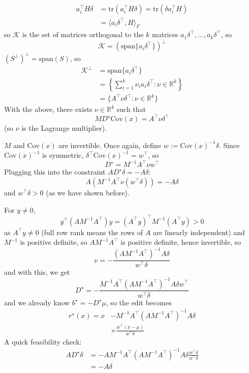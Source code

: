 \documentclass[10pt,a4paper,twocolumn]{article}
\newcommand{\R}{\mathbb{R}}
\begin{document}
	$$\begin{aligned}
		a_i^\top H \delta & = \mathrm{tr} \left( a_i^\top H \delta \right) = \mathrm{tr} \left( \delta a_i^\top H \right) \\
		& = \langle a_i \delta^\top, H \rangle_F
	\end{aligned}$$
	so $\mathcal{K}$ is the set of matrices orthogonal to the $k$ matrices $a_1 \delta^\top, \dots, a_k \delta^\top$, so
	$$\mathcal{K} = \left( \mathrm{span} \{ a_i \delta^\top \} \right)^\perp$$
	$(S^\perp)^\perp = \mathrm{span}(S)$, so
	$$\begin{aligned}
		\mathcal{K}^\perp & = \mathrm{span} \{ a_i \delta^\top \} \\
		& = \left\{ \sum_{i = 1}^k \nu_i a_i \delta^\top : \nu \in \R^k \right\} \\
		& = \{ A^\top \nu \delta^\top : \nu \in \R^k \}
	\end{aligned}$$
	With the above, there exists $\nu \in \R^k$ such that
	$$M D^\star \mathrm{Cov}(x) = A^\top \nu \delta^\top$$
	(so $\nu$ is the Lagrange multiplier).

	$M$ and $\mathrm{Cov}(x)$ are invertible. Once again, define $w := \mathrm{Cov}(x)^{-1} \delta$. Since $\mathrm{Cov}(x)^{-1}$ is symmetric, $\delta^\top \mathrm{Cov}(x)^{-1} = w^\top$, so
	$$D^\star = M^{-1} A^\top \nu w^\top$$
	Plugging this into the constraint $A D^\star \delta = - A \delta$:
	$$A \left( M^{-1} A^\top \nu (w^\top \delta) \right) = - A \delta$$
	and $w^\top \delta > 0$ (as we have shown before).

	For $y \ne 0$,
	$$y^\top (A M^{-1} A^\top) y = (A^\top y)^\top M^{-1} (A^\top y) > 0$$
	as $A^\top y \ne 0$ (full row rank means the rows of $A$ are linearly independent) and $M^{-1}$ is positive definite, so $A M^{-1} A^\top$ is positive definite, hence invertible, so
	$$\nu = - \frac{(A M^{-1} A^\top)^{-1} A \delta}{w^\top \delta}$$
	and with this, we get
	$$D^\star = - \frac{M^{-1} A^\top (A M^{-1} A^\top)^{-1} A \delta w^\top}{w^\top \delta}$$
	and we already know $b^\star = - D^\star \mu$, so the edit becomes
	$$\begin{aligned}
		r^\star(x) = x & - M^{-1} A^\top (A M^{-1} A^\top)^{-1} A \delta \\
		& \times \frac{w^\top (x - \mu)}{w^\top \delta}
	\end{aligned}$$
	A quick feasibility check:
	$$\begin{aligned}
		A D^\star \delta & = - A M^{-1} A^\top (A M^{-1} A^\top)^{-1} A \delta \frac{w^\top \delta}{w^\top \delta} \\
		& = - A \delta
	\end{aligned}$$
\end{document}
